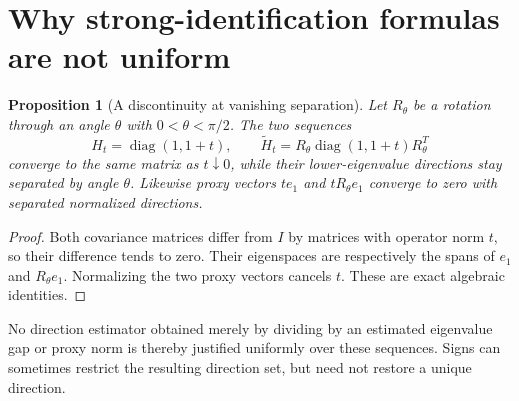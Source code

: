 \documentclass[11pt,a4paper]{article}
\newtheorem{proposition}[theorem]{Proposition}
\theoremstyle{definition}
\theoremstyle{remark}
\DeclareMathOperator{\diag}{diag}
\begin{document}
\section{Why strong-identification formulas are not uniform}
\begin{proposition}[A discontinuity at vanishing separation]
Let $R_\theta$ be a rotation through an angle $\theta$ with $0<\theta<\pi/2$. The two sequences
\[
 H_t=\diag(1,1+t),\qquad
 \widetilde H_t=R_\theta\diag(1,1+t)R_\theta^T
\]
converge to the same matrix as $t\downarrow0$, while their lower-eigenvalue directions stay separated by angle $\theta$. Likewise proxy vectors $t e_1$ and $t R_\theta e_1$ converge to zero with separated normalized directions.
\end{proposition}
\begin{proof}
Both covariance matrices differ from $I$ by matrices with operator norm $t$, so their difference tends to zero. Their eigenspaces are respectively the spans of $e_1$ and $R_\theta e_1$. Normalizing the two proxy vectors cancels $t$. These are exact algebraic identities.
\end{proof}
No direction estimator obtained merely by dividing by an estimated eigenvalue gap or proxy norm is thereby justified uniformly over these sequences. Signs can sometimes restrict the resulting direction set, but need not restore a unique direction.
\end{document}

